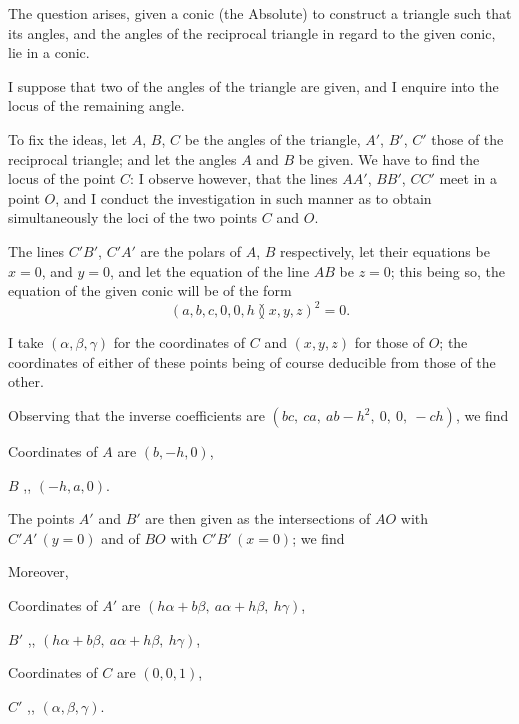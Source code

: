 \documentclass[11pt,a4paper]{article}
\theoremstyle{plain}
\begin{document}
\newpage
\setcounter{equation}{15}

The question arises, given a conic (the Absolute) to construct a triangle such that its angles, and the angles of the reciprocal triangle in regard to the given conic, lie in a conic.

I suppose that two of the angles of the triangle are given, and I enquire into the locus of the remaining angle.

To fix the ideas, let $A$, $B$, $C$ be the angles of the triangle, $A'$, $B'$, $C'$ those of the reciprocal triangle; and let the angles $A$ and $B$ be given. We have to find the locus of the point $C$: I observe however, that the lines $AA'$, $BB'$, $CC'$ meet in a point $O$, and I conduct the investigation in such manner as to obtain simultaneously the loci of the two points $C$ and $O$.

The lines $C'B'$, $C'A'$ are the polars of $A$, $B$ respectively, let their equations be $x = 0$, and $y = 0$, and let the equation of the line $AB$ be $z = 0$; this being so, the equation of the given conic will be of the form
\begin{equation}
(a, b, c, 0, 0, h \between x, y, z)^2 = 0.
\end{equation}

I take $(\alpha, \beta, \gamma)$ for the coordinates of $C$ and $(x, y, z)$ for those of $O$; the coordinates of either of these points being of course deducible from those of the other.

Observing that the inverse coefficients are $(bc,\ ca,\ ab-h^2,\ 0,\ 0,\ -ch)$, we find

Coordinates of $A$ are $(b, -h, 0)$,

$B$ \hspace{2em} ,, \hspace{2em} $(-h, a, 0)$.

The points $A'$ and $B'$ are then given as the intersections of $AO$ with $C'A'\,(y=0)$ and of $BO$ with $C'B'\,(x=0)$; we find

Moreover,

Coordinates of $A'$ are $(h\alpha + b\beta,\ a\alpha + h\beta,\ h\gamma)$,

$B'$ \hspace{2em} ,, \hspace{2em} $(h\alpha + b\beta,\ a\alpha + h\beta,\ h\gamma)$,

Coordinates of $C$ are $(0, 0, 1)$,

$C'$ \hspace{2em} ,, \hspace{2em} $(\alpha, \beta, \gamma)$.
\end{document}
